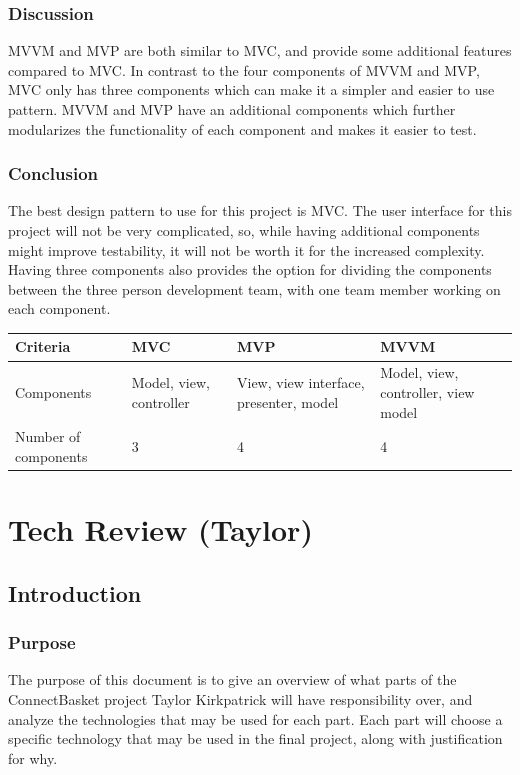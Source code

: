 \documentclass[onecolumn, draftclsnofoot,10pt, compsoc]{IEEEtran}
\begin{document}
\subsubsection{Discussion}
MVVM and MVP are both similar to MVC, and provide some additional features compared to MVC. In contrast to the four components of MVVM and MVP, MVC only has three components which can make it a simpler and easier to use pattern. MVVM and MVP have an additional components which further modularizes the functionality of each component and makes it easier to test.

\subsubsection{Conclusion}
The best design pattern to use for this project is MVC. The user interface for this project will not be very complicated, so, while having additional components might improve testability, it will not be worth it for the increased complexity. Having three components also provides the option for dividing the components between the three person development team, with one team member working on each component.

\begin{table}[h!]
\centering
\begin{tabular}{ |p{.2\linewidth}|p{.2\linewidth}|p{.2\linewidth}|p{.2\linewidth}| } 
\hline
\textbf{Criteria} & \textbf{MVC} & \textbf{MVP} & \textbf{MVVM} \\ \hline
Components & Model, view, controller & View, view interface, presenter, model & Model, view, controller, view model \\ \hline
Number of components & 3 & 4 & 4 \\ \hline
\end{tabular}
\end{table}


\newpage
\section{Tech Review (Taylor)}

\subsection{Introduction}

\subsubsection{Purpose}
The purpose of this document is to give an overview of what parts of the ConnectBasket project Taylor Kirkpatrick will have responsibility over,
and analyze the technologies that may be used for each part. Each part will choose a specific technology that may be used in the final project, 
along with justification for why.
\end{document}
